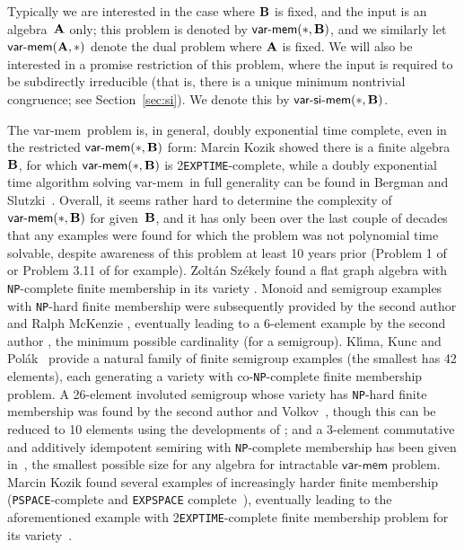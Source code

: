 \documentclass[reqno]{amsart}
\theoremstyle{plain}
\theoremstyle{definition}
\newcommand{\varmem}{\textsf{var-mem}}
\newcommand{\varsimem}{\textsf{var-si-mem}}
\begin{document}
Typically we are interested in the case where ${\bf B}$ is fixed, and the input is an algebra~${\bf A}$ only; this problem is denoted by $\varmem(*,{\bf B})$, and we similarly let $\varmem({\bf A},*)$ denote the dual problem where ${\bf A}$ is fixed.  We will also be interested in a promise restriction of this problem, where the input is required to be subdirectly irreducible (that is, there is a unique minimum nontrivial congruence; see Section~\ref{sec:si}).  We denote this by $\varsimem(*,{\bf B})$.

The \varmem\ problem is, in general, doubly exponential time complete, even in the restricted $\varmem(*,{\bf B})$ form: Marcin Kozik \cite{koz09} showed there is a finite algebra~${\bf B}$, for which $\varmem(*,{\bf B})$ is 2\texttt{EXPTIME}-complete, while a doubly exponential time algorithm solving \varmem\ in full generality can be found in Bergman and Slutzki~\cite{berslu00}.  
Overall, it seems rather hard to determine the complexity of $\varmem(*,{\bf B})$ for given~${\bf B}$, and it has only been over the last couple of decades that any examples were found for which the problem was not polynomial time solvable, despite awareness of this problem at least 10 years prior (Problem 1 of \cite{alm} or Problem 3.11 of \cite{khasap} for example).
Zolt\'an Sz\'ekely found a flat graph algebra with \texttt{NP}-complete finite membership in its variety \cite{sze}.  Monoid and semigroup examples with \texttt{NP}-hard finite membership were subsequently provided by the second author and Ralph McKenzie \cite{jacmck}, eventually leading to a 6-element example by the second author \cite{jac:SAT}, the minimum possible cardinality (for a semigroup).  Kl\'{\i}ma, Kunc and Pol\'{a}k~\cite{KKP} provide a natural family of finite semigroup examples (the smallest has 42 elements), each generating a variety with co-\texttt{NP}-complete finite membership problem.  
A 26-element involuted semigroup whose variety has \texttt{NP}-hard finite membership was found by the second author and Volkov~\cite{jacvol}, though this can be reduced to 10 elements using the developments of \cite{jac:SAT}; and a $3$-element commutative and additively idempotent semiring with \texttt{NP}-complete membership has been given in~\cite{JRZ}, the smallest possible size for any algebra for intractable $\varmem$ problem. 
Marcin Kozik found several examples of increasingly harder finite membership (\texttt{PSPACE}-complete and \texttt{EXPSPACE} complete~\cite{koz07}), eventually leading to the aforementioned example with 2\texttt{EXPTIME}-complete finite membership problem for its variety~\cite{koz09}.
\end{document}
